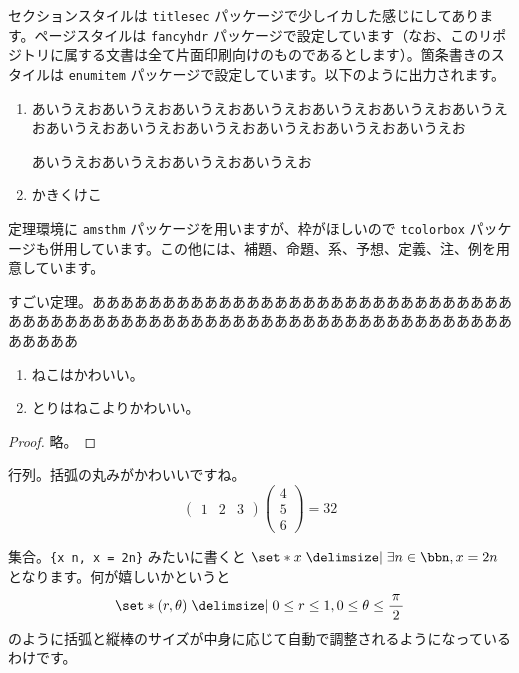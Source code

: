 \documentclass[a4paper]{ltjsarticle}
\begin{document}
セクションスタイルは \texttt{titlesec} パッケージで少しイカした感じにしてあります。ページスタイルは \texttt{fancyhdr} パッケージで設定しています（なお、このリポジトリに属する文書は全て片面印刷向けのものであるとします）。箇条書きのスタイルは \texttt{enumitem} パッケージで設定しています。以下のように出力されます。
\begin{enumerate}
  \item あいうえおあいうえおあいうえおあいうえおあいうえおあいうえおあいうえおあいうえおあいうえおあいうえおあいうえおあいうえおあいうえお

  あいうえおあいうえおあいうえおあいうえお
  \item かきくけこ
\end{enumerate}

定理環境に \texttt{amsthm} パッケージを用いますが、枠がほしいので \texttt{tcolorbox} パッケージも併用しています。この他には、補題、命題、系、予想、定義、注、例を用意しています。
\begin{thm}[ねこちゃんの定理]
  すごい定理。あああああああああああああああああああああああああああああああああああああああああああああああああああああああああああああああああああああああ
  \begin{enumerate}
    \item ねこはかわいい。
    \item とりはねこよりかわいい。
  \end{enumerate}
\end{thm}
\begin{proof}
  略。
\end{proof}

行列。括弧の丸みがかわいいですね。
\begin{equation}
  {\begin{pmatrix}
    1 & 2 & 3
  \end{pmatrix}}{\begin{pmatrix}
    4 \\ 5 \\ 6
  \end{pmatrix}} = 32
\end{equation}

集合。\texttt{\string\set*\{x\string\given\string\exists\ n\string\in\string\bbn, x = 2n\}} みたいに書くと $\set*{x\given\exists n\in\bbn, x = 2n}$ となります。何が嬉しいかというと
\begin{equation}
  \set*{(r, \theta)\given 0\leq r\leq 1, 0\leq\theta\leq\sfrac{\pi}{2}}
\end{equation}
のように括弧と縦棒のサイズが中身に応じて自動で調整されるようになっているわけです。
\end{document}
